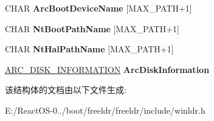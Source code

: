 \begin{DoxyCompactItemize}
\item 
\mbox{\label{struct___l_o_a_d_e_r___s_y_s_t_e_m___b_l_o_c_k_a953a8b1037e0d9c89ac2e764d8c016bf}} 
C\+H\+AR {\bfseries Arc\+Boot\+Device\+Name} \mbox{[}M\+A\+X\+\_\+\+P\+A\+TH+1\mbox{]}
\item 
\mbox{\label{struct___l_o_a_d_e_r___s_y_s_t_e_m___b_l_o_c_k_a50111f6758b7f4203ee133bba3791e0a}} 
C\+H\+AR {\bfseries Nt\+Boot\+Path\+Name} \mbox{[}M\+A\+X\+\_\+\+P\+A\+TH+1\mbox{]}
\item 
\mbox{\label{struct___l_o_a_d_e_r___s_y_s_t_e_m___b_l_o_c_k_a0919bbf69c6143a33846fa2239957b1c}} 
C\+H\+AR {\bfseries Nt\+Hal\+Path\+Name} \mbox{[}M\+A\+X\+\_\+\+P\+A\+TH+1\mbox{]}
\item 
\mbox{\label{struct___l_o_a_d_e_r___s_y_s_t_e_m___b_l_o_c_k_a35ebe37a55a6fbd8596aeea5ba5f96a7}} 
\hyperlink{struct___a_r_c___d_i_s_k___i_n_f_o_r_m_a_t_i_o_n}{A\+R\+C\+\_\+\+D\+I\+S\+K\+\_\+\+I\+N\+F\+O\+R\+M\+A\+T\+I\+ON} {\bfseries Arc\+Disk\+Information}
\end{DoxyCompactItemize}


该结构体的文档由以下文件生成\+:\begin{DoxyCompactItemize}
\item 
E\+:/\+React\+O\+S-\/0../boot/freeldr/freeldr/include/winldr.\+h\end{DoxyCompactItemize}
